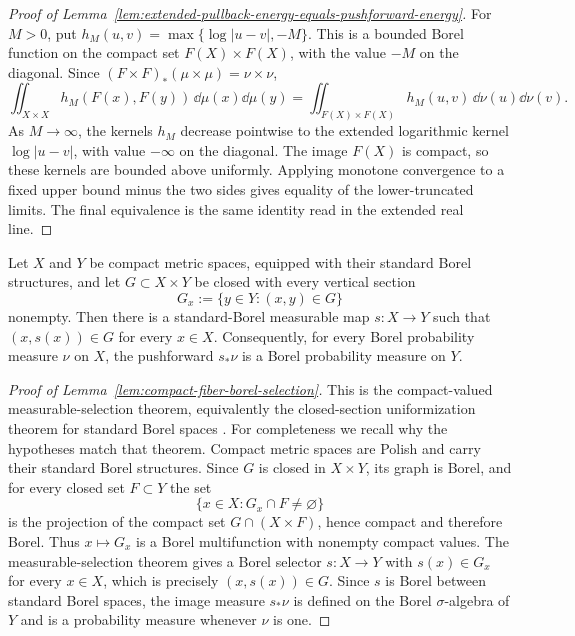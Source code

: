 \begin{proof}[Proof of Lemma~\ref{lem:extended-pullback-energy-equals-pushforward-energy}]
For \(M>0\), put \(h_M(u,v)=\max\{\log|u-v|,-M\}\).  This is a bounded Borel function on the compact set \(F(X)\times F(X)\), with the value \(-M\) on the diagonal.  Since \((F\times F)_\ast(\mu\times\mu)=\nu\times\nu\),
\[
\iint_{X\times X} h_M(F(x),F(y))\,\dd\mu(x)\dd\mu(y)
=
\iint_{F(X)\times F(X)}h_M(u,v)\,\dd\nu(u)\dd\nu(v).
\]
As \(M\to\infty\), the kernels \(h_M\) decrease pointwise to the extended logarithmic kernel \(\log|u-v|\), with value \(-\infty\) on the diagonal.  The image \(F(X)\) is compact, so these kernels are bounded above uniformly.  Applying monotone convergence to a fixed upper bound minus the two sides gives equality of the lower-truncated limits.  The final equivalence is the same identity read in the extended real line.
\end{proof}

\begin{lemma}\label{lem:compact-fiber-borel-selection}
Let \(X\) and \(Y\) be compact metric spaces, equipped with their standard Borel structures, and let \(G\subset X\times Y\) be closed with every vertical section
\[
G_x:=\{y\in Y:(x,y)\in G\}
\]
nonempty.  Then there is a standard-Borel measurable map \(s:X\to Y\) such that \((x,s(x))\in G\) for every \(x\in X\).  Consequently, for every Borel probability measure \(\nu\) on \(X\), the pushforward \(s_\ast\nu\) is a Borel probability measure on \(Y\).
\end{lemma}

\begin{proof}[Proof of Lemma~\ref{lem:compact-fiber-borel-selection}]
This is the compact-valued measurable-selection theorem, equivalently the closed-section uniformization theorem for standard Borel spaces \citep[Theorem~18.13]{Kechris1995}.  For completeness we recall why the hypotheses match that theorem.  Compact metric spaces are Polish and carry their standard Borel structures.  Since \(G\) is closed in \(X\times Y\), its graph is Borel, and for every closed set \(F\subset Y\) the set
\[
\{x\in X:G_x\cap F\ne\varnothing\}
\]
is the projection of the compact set \(G\cap(X\times F)\), hence compact and therefore Borel.  Thus \(x\mapsto G_x\) is a Borel multifunction with nonempty compact values.  The measurable-selection theorem gives a Borel selector \(s:X\to Y\) with \(s(x)\in G_x\) for every \(x\in X\), which is precisely \((x,s(x))\in G\).  Since \(s\) is Borel between standard Borel spaces, the image measure \(s_\ast\nu\) is defined on the Borel \(\sigma\)-algebra of \(Y\) and is a probability measure whenever \(\nu\) is one.
\end{proof}

